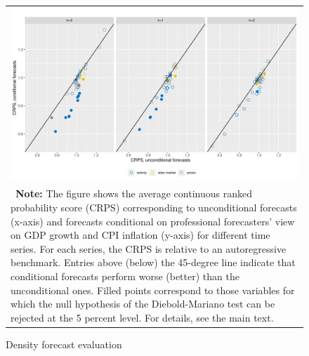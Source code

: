 \documentclass[notitlepage,a4paper,12pt]{article}
\begin{document}
\begin{figure}[htp!] \centering
    \caption{Density forecast evaluation \label{fig:crps}}
    \footnotesize
    \begin{tabular}{p{16cm}}
        \multicolumn{1}{c}{\includegraphics*[scale = 0.6]{../figures/fig_eval_crps.pdf}} \\
        {
        \footnotesize \textbf{Note:} The figure shows the average continuous ranked probability score (CRPS)  corresponding to unconditional forecasts (x-axis) and forecasts conditional on professional forecasters' view on GDP growth and CPI inflation (y-axis) for different time series. For each series, the CRPS is relative to an autoregressive benchmark. Entries above (below) the 45-degree line indicate that conditional forecasts perform worse (better) than the unconditional ones. Filled points correspond to those variables for which the null hypothesis of the Diebold-Mariano test can be rejected at the 5 percent level. For details, see the main text. 
        }
        \end{tabular}
    \newline
    \normalsize
\end{figure}
\end{document}
